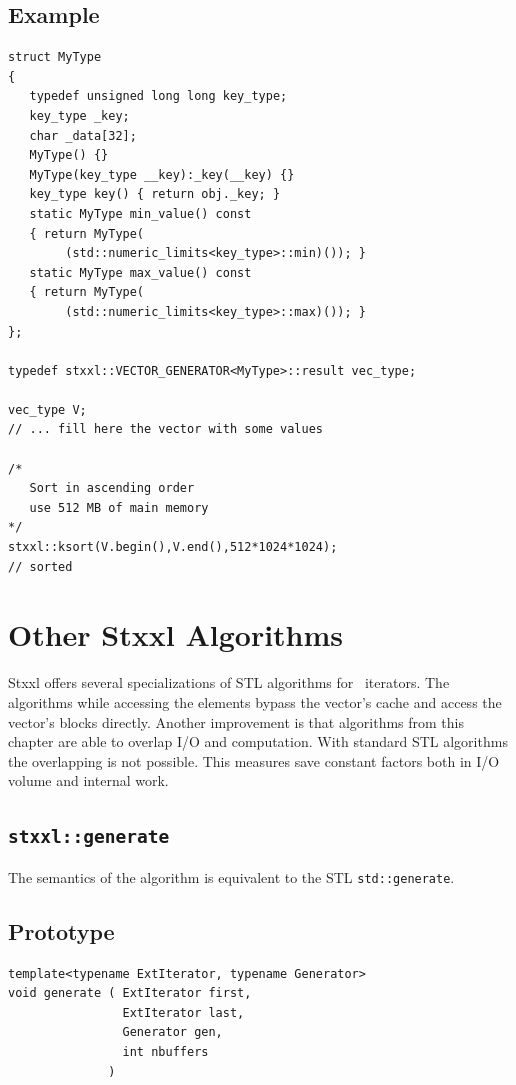 \documentclass[twoside]{book}
\newcommand{\stxxl}{{\sc Stxxl} }
\begin{document}
\subsection*{Example}
\begin{lstlisting}
struct MyType
{
   typedef unsigned long long key_type;
   key_type _key;
   char _data[32];
   MyType() {}
   MyType(key_type __key):_key(__key) {}
   key_type key() { return obj._key; }
   static MyType min_value() const 
   { return MyType(
        (std::numeric_limits<key_type>::min)()); }
   static MyType max_value() const 
   { return MyType(
        (std::numeric_limits<key_type>::max)()); }
};

typedef stxxl::VECTOR_GENERATOR<MyType>::result vec_type;

vec_type V;
// ... fill here the vector with some values

/*
   Sort in ascending order
   use 512 MB of main memory
*/
stxxl::ksort(V.begin(),V.end(),512*1024*1024);
// sorted
\end{lstlisting}



\section{Other \stxxl Algorithms}
\label{otheralgs}

\stxxl offers several specializations of STL algorithms for \xvector\ 
iterators. The algorithms while accessing the elements bypass the
vector's cache and access the vector's blocks directly. Another
improvement is that algorithms from this chapter are able to overlap
I/O and computation. With standard STL algorithms the overlapping is
not possible. 
This measures save constant factors both in I/O volume and internal
work. 
\subsection{\texttt{stxxl::generate}}
\label{stxxl::generate}
The semantics of the algorithm is equivalent to the STL
\texttt{std::generate}. 

\subsection*{Prototype}
\begin{lstlisting}
template<typename ExtIterator, typename Generator>
void generate ( ExtIterator first,
                ExtIterator last,
                Generator gen,
                int nbuffers
              ) 
\end{lstlisting}
\end{document}
